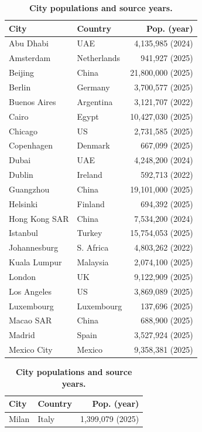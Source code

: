 \documentclass{mcmthesis}
\newcommand\hd[1]{{\sffamily\bfseries\color{Navy}#1}}          %
\begin{document}
\begin{table}[!htbp]\centering
\caption{\textbf{City populations and source years.}}\label{tab:cityprofile}
\begingroup\fontsize{9}{10.8}\selectfont\setlength{\tabcolsep}{2pt}
\begin{minipage}[t]{.49\linewidth}\centering
\begin{tabular}{@{}llr@{}}
\toprule \hd{City} & \hd{Country} & \hd{Pop. (year)}\\\midrule
Abu Dhabi & UAE & 4,135,985 (2024)\\
Amsterdam & Netherlands & 941,927 (2025)\\
Beijing & China & 21,800,000 (2025)\\
Berlin & Germany & 3,700,577 (2025)\\
Buenos Aires & Argentina & 3,121,707 (2022)\\
Cairo & Egypt & 10,427,030 (2025)\\
Chicago & US & 2,731,585 (2025)\\
Copenhagen & Denmark & 667,099 (2025)\\
Dubai & UAE & 4,248,200 (2024)\\
Dublin & Ireland & 592,713 (2022)\\
Guangzhou & China & 19,101,000 (2025)\\
Helsinki & Finland & 694,392 (2025)\\
Hong Kong SAR & China & 7,534,200 (2024)\\
Istanbul & Turkey & 15,754,053 (2025)\\
Johannesburg & S. Africa & 4,803,262 (2022)\\
Kuala Lumpur & Malaysia & 2,074,100 (2025)\\
London & UK & 9,122,909 (2025)\\
Los Angeles & US & 3,869,089 (2025)\\
Luxembourg & Luxembourg & 137,696 (2025)\\
Macao SAR & China & 688,900 (2025)\\
Madrid & Spain & 3,527,924 (2025)\\
Mexico City & Mexico & 9,358,381 (2025)\\
\bottomrule\end{tabular}\end{minipage}\hfill
\begin{minipage}[t]{.49\linewidth}\centering
\begin{tabular}{@{}llr@{}}
\toprule \hd{City} & \hd{Country} & \hd{Pop. (year)}\\\midrule
Milan & Italy & 1,399,079 (2025)\\

\end{tabular}
\end{minipage}
\end{table}
\end{document}
